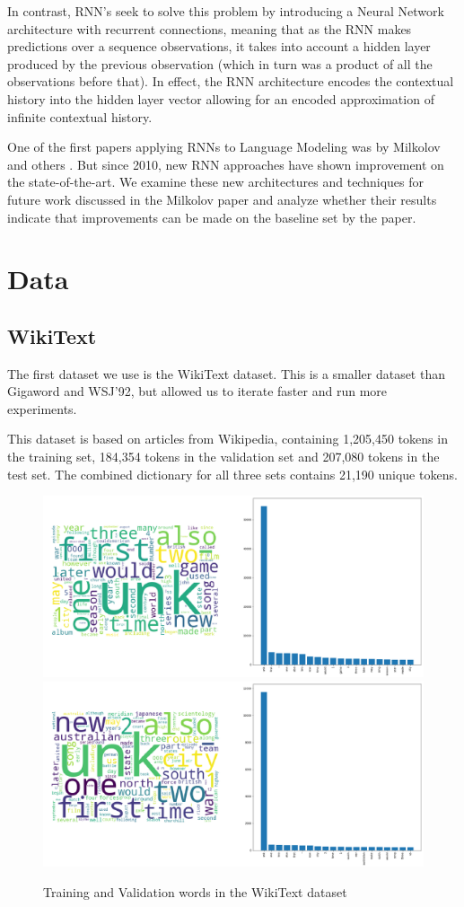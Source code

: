 \documentclass[a4paper]{article}
\begin{document}
In contrast, RNN's seek to solve this problem by introducing a Neural Network
architecture with recurrent connections, meaning that as the RNN makes predictions
over a sequence observations, it takes into account a hidden layer produced
by the previous observation (which in turn was a product of all the observations
before that). In effect, the RNN architecture encodes the contextual history
into the hidden layer vector allowing for an encoded approximation of infinite
contextual history.

One of the first papers applying RNNs to Language Modeling was by Milkolov and others \cite{Milkolov10}.
But since 2010, new RNN approaches have shown improvement on the state-of-the-art.
We examine these new architectures and techniques for future work discussed in the
Milkolov paper and analyze whether their results indicate that improvements can be made
on the baseline set by the paper.

\section{Data}
\label{sec:data}

\subsection{WikiText}
\label{sec:wikitext}

The first dataset we use is the WikiText dataset. This is a smaller dataset than
Gigaword and WSJ'92, but allowed us to
iterate faster and run more experiments.

This dataset is based on articles from Wikipedia, containing 1,205,450 tokens in
the training set, 184,354 tokens in the validation set and 207,080 tokens
in the test set. The combined dictionary for all three sets contains 21,190
unique tokens.

\begin{figure}[!ht]
\includegraphics[width=0.8\columnwidth]{sr-eda-wikitext-train-words}
\includegraphics[width=0.8\columnwidth]{sr-eda-wikitext-valid-words}
\centering
\caption{Training and Validation words in the WikiText dataset}
\end{figure}
\end{document}
